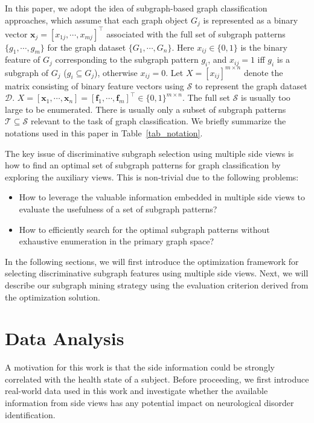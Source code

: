\documentclass[conference]{IEEEtran}
\begin{document}
In this paper, we adopt the idea of subgraph-based graph classification approaches, which assume that each graph object $G_j$ is represented as a binary vector $\mathbf{x}_j=[x_{1j},\cdots,x_{mj}]^\top$ associated with the full set of subgraph patterns $\{g_1,\cdots,g_m\}$ for the graph dataset $\{G_1,\cdots,G_n\}$. Here $x_{ij}\in\{0,1\}$ is the binary feature of $G_j$ corresponding to the subgraph pattern $g_i$, and $x_{ij}=1$ iff $g_i$ is a subgraph of $G_j$ ($g_i\subseteq G_j$), otherwise $x_{ij}=0$. Let $X=[x_{ij}]^{m\times n}$ denote the matrix consisting of binary feature vectors using $\mathcal{S}$ to represent the graph dataset $\mathcal{D}$. $X=[\mathbf{x}_1,\cdots,\mathbf{x}_n]=[\mathbf{f}_1,\cdots,\mathbf{f}_m]^\top\in\{0,1\}^{m\times n}$. The full set $\mathcal{S}$ is usually too large to be enumerated. There is usually only a subset of subgraph patterns $\mathcal{T}\subseteq\mathcal{S}$ relevant to the task of graph classification. We briefly summarize the notations used in this paper in Table~\ref{tab_notation}.

The key issue of discriminative subgraph selection using multiple side views is how to find an optimal set of subgraph patterns for graph classification by exploring the auxiliary views. This is non-trivial due to the following problems:
\begin{itemize}
\item How to leverage the valuable information embedded in multiple side views to evaluate the usefulness of a set of subgraph patterns?
\item How to efficiently search for the optimal subgraph patterns without exhaustive enumeration in the primary graph space?
\end{itemize}

In the following sections, we will first introduce the optimization framework for selecting discriminative subgraph features using multiple side views. Next, we will describe our subgraph mining strategy using the evaluation criterion derived from the optimization solution.

\section{Data Analysis}\label{sec:data}

A motivation for this work is that the side information could be strongly correlated with the health state of a subject. Before proceeding, we first introduce real-world data used in this work and investigate whether the available information from side views has any potential impact on neurological disorder identification.
\end{document}

